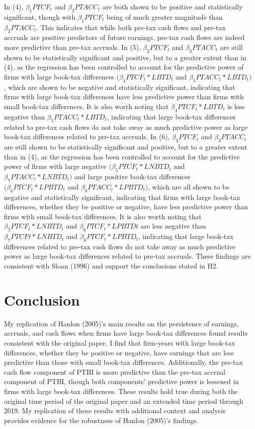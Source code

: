 \documentclass{article}
\begin{document}
In (4), $\beta_1PTCF_t$ and $\beta_2PTACC_t$ are both shown to be positive and statistically significant, though with $\beta_1PTCF_t$ being of much greater magnitude than $\beta_2PTACC_t$. This indicates that while both pre-tax cash flows and pre-tax accruals are positive predictors of future earnings, pre-tax cash flows are indeed more predictive than pre-tax accruals. In (5), $\beta_2PTCF_t$ and $\beta_3PTACC_t$ are still shown to be statistically significant and positive, but to a greater extent than in (4), as the regression has been controlled to account for the predictive power of firms with large book-tax differences $(\beta_4PTCF_t * LBTD_t$ and $\beta_5PTACC_t * LBTD_t)$, which are shown to be negative and statistically significant, indicating that firms with large book-tax differences have less predictive power than firms with small book-tax differences. It is also worth noting that $\beta_4PTCF_t * LBTD_t$ is less negative than $\beta_5PTACC_t * LBTD_t$, indicating that large book-tax differences related to pre-tax cash flows do not take away as much predictive power as large book-tax differences related to pre-tax accruals. In (6), $\beta_2PTCF_t$ and $\beta_3PTACC_t$ are still shown to be statistically significant and positive, but to a greater extent than in (4), as the regression has been controlled to account for the predictive power of firms with large negative $(\beta_5PTCF_t * LNBTD_t$ and $\beta_7PTACC_t * LNBTD_t)$ and large positive book-tax differences $(\beta_6PTCF_t * LPBTD_t$ and $\beta_8PTACC_t * LPBTD_t)$, which are all shown to be negative and statistically significant, indicating that firms with large book-tax differences, whether they be positive or negative, have less predictive power than firms with small book-tax differences. It is also worth noting that $\beta_5PTCF_t * LNBTD_t$ and $\beta_6PTCF_t * LPBTDt$ are less negative than $\beta_7PTCFt * LNBTD_t$ and $\beta_8PTCF_t * LPBTD_t$, indicating that large book-tax differences related to pre-tax cash flows do not take away as much predictive power as large book-tax differences related to pre-tax accruals. These findings are consistent with Sloan (1996) and support the conclusions stated in H2.

\section{Conclusion}
My replication of Hanlon (2005)’s main results on the persistence of earnings, accruals, and cash flows when firms have large book-tax differences found results consistent with the original paper. I find that firm-years with large book-tax differences, whether they be positive or negative, have earnings that are less predictive than those with small book-tax differences. Additionally, the pre-tax cash flow component of PTBI is more predictive than the pre-tax accrual component of PTBI, though both components’ predictive power is lessened in firms with large book-tax differences. These results hold true during both the original time period of the original paper and an extended time period through 2019. My replication of these results with additional context and analysis provides evidence for the robustness of Hanlon (2005)’s findings.
\end{document}
